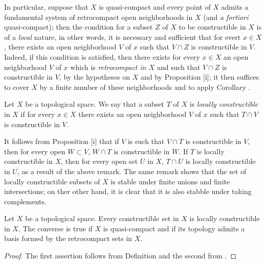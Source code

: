 \begin{env}[9.1.10]
\label{0.9.1.10}
In particular, suppose that $X$ is quasi-compact and every point
of $X$ admits a fundamental system of retrocompact open neighborhoods in $X$ (and \emph{a fortiori} quasi-compact); then the condition for a subset $Z$ of $X$ to be constructible in $X$ is of a \emph{local} nature, in other words, it is necessary and sufficient that for evert $x\in X$, there exists an open neighborhood $V$ of $x$ such that $V\cap Z$ is constructible in $V$.
Indeed, if this condition is satisfied, then there exists for every $x\in X$ an open neighborhood $V$ of $x$ which is \emph{retrocompact in $X$} and such that $V\cap Z$ is constructible in $V$, by the hypotheses on $X$ and by Proposition [i]; it then suffices to cover $X$ by a finite number of these neighborhoods and to apply Corollary .
\end{env}

\begin{defn}[9.1.11]
\label{0.9.1.11}
Let $X$ be a topological space.
We say that a subset $T$ of $X$ is \emph{locally constructible} in $X$ if for every $x\in X$ there exists an open neighborhood $V$ of $x$ such that $T\cap V$ is constructible in $V$.
\end{defn}

It follows from Proposition [i] that if $V$ is such that $V\cap T$ is constructible in $V$, then for every open $W\subset V$, $W\cap T$ is constructible in $W$.
If $T$ is locally constructible in $X$, then for every open set $U$ in $X$, $T\cap U$ is locally constructible in $U$, as a result of the above remark.
The same remark shows that the set of locally constructible subsets of $X$ is stable under finite unions and finite intersections; on ther other hand, it is clear that it is also stabble under taking complements.

\begin{prop}[9.1.12]
\label{0.9.1.12}
Let $X$ be a topological space.
Every constructible set in $X$ is locally constructible in $X$.
The converse is true if $X$ is quasi-compact and if its topology admits a basis formed by the retrocompact sets in $X$.
\end{prop}

\begin{proof}
\label{proof-0.9.1.12}
The first assertion follows from Definition  and the second from .
\end{proof}

